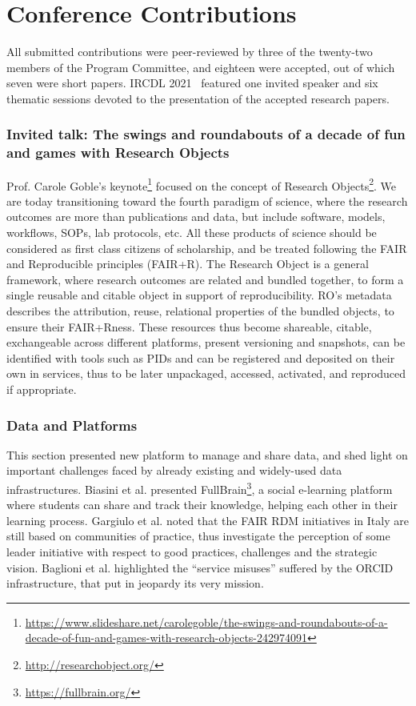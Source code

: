 \documentclass{sig-alternate-10pt}
\begin{document}
\section{Conference Contributions}
All submitted contributions were peer-reviewed by three of the twenty-two members of the Program Committee, and eighteen were accepted, out of which seven were short papers. IRCDL 2021~\cite{IRCDL2021} featured one invited speaker and six thematic sessions devoted to the presentation of the accepted research papers.

\subsubsection*{Invited talk: The swings and roundabouts of a decade of fun and games with Research Objects} Prof. Carole Goble's keynote\footnote{\url{https://www.slideshare.net/carolegoble/the-swings-and-roundabouts-of-a-decade-of-fun-and-games-with-research-objects-242974091}} focused on the concept of Research Objects\footnote{\url{http://researchobject.org/}}\cite{bechhofer2013linked}. We are today transitioning toward the fourth paradigm of science, where the research outcomes are more than publications and data, but include software, models, workflows, SOPs, lab protocols, etc. All these products of science should be considered as first class citizens of scholarship, and be treated following the FAIR and Reproducible principles (FAIR+R). 
The Research Object is a general framework, where research outcomes are related and bundled together, to form a single reusable and citable object in support of reproducibility. RO's metadata describes the attribution, reuse, relational properties of the bundled objects, to ensure their FAIR+Rness. These resources thus become shareable, citable, exchangeable across different platforms, present versioning and snapshots, can be identified with tools such as PIDs and can be registered and deposited on their own in services, thus to be later unpackaged, accessed, activated, and reproduced if appropriate. 

\subsubsection*{Data and Platforms}
This section presented new platform to manage and share data, and shed light on important challenges faced by already existing and widely-used data infrastructures.
Biasini et al. \cite{biasini2021fullbrain} presented FullBrain\footnote{\url{https://fullbrain.org/}}, a social e-learning platform where students can share and track their knowledge, helping each other in their learning process.
Gargiulo et al. \cite{GargiuloGTZ21} noted that the FAIR RDM initiatives in Italy are still based on communities of practice, thus investigate the perception of some leader initiative with respect to good practices, challenges and the strategic vision. 
Baglioni et al. \cite{BaglioniMMABB21} highlighted the ``service misuses'' suffered by the ORCID infrastructure, that put in jeopardy its very mission.
\end{document}
